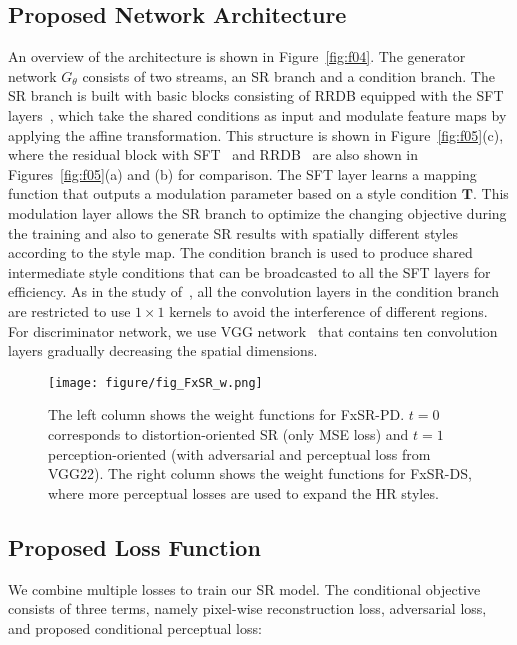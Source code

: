 \documentclass{article}
\begin{document}
\subsection{Proposed Network Architecture}
An overview of the architecture is shown in Figure~\ref{fig:f04}. The generator network ${G}_{\theta}$ consists of two streams, an SR branch and a condition branch. The SR branch is built with basic blocks consisting of RRDB equipped with the SFT layers~\cite{2018recovering}, which take the shared conditions as input and modulate feature maps by applying the affine transformation. This structure is shown in Figure~\ref{fig:f05}(c), where the residual block with SFT~\cite{2018recovering} and RRDB~\cite{2018esrgan} are also shown in Figures~\ref{fig:f05}(a) and (b) for comparison. The SFT layer learns a mapping function that outputs a modulation parameter based on a style condition $\mathbf{T}$. This modulation layer allows the SR branch to optimize the changing objective during the training and also to generate SR results with spatially different styles according to the style map. The condition branch is used to produce shared intermediate style conditions that can be broadcasted to all the SFT layers for efficiency. As in the study of~\cite{2018recovering}, all the convolution layers in the condition branch are restricted to use ${1}\times{1}$ kernels to avoid the interference of different regions. For discriminator network, we use VGG network~\cite{SimonyanZ14a} that contains ten convolution layers gradually decreasing the spatial dimensions.
\begin{figure}[!t]
\centering
\begin{minipage}[t]{1.0\linewidth}
    \centering
    {\texttt{[image: figure/fig\_FxSR\_w.png]}}\vfill
\end{minipage}
\caption{The left column shows the weight functions for FxSR-PD. $t=0$ corresponds to distortion-oriented SR (only MSE loss) and $t=1$ perception-oriented (with adversarial and perceptual loss from VGG22). The right column shows the weight functions for FxSR-DS, where more perceptual losses are used to expand the HR styles.}
\label{fig:FxSR_w}
\end{figure}
\subsection{Proposed Loss Function}
We combine multiple losses to train our SR model. The conditional objective consists of three terms, namely pixel-wise reconstruction loss, adversarial loss, and proposed conditional perceptual loss:
\end{document}
